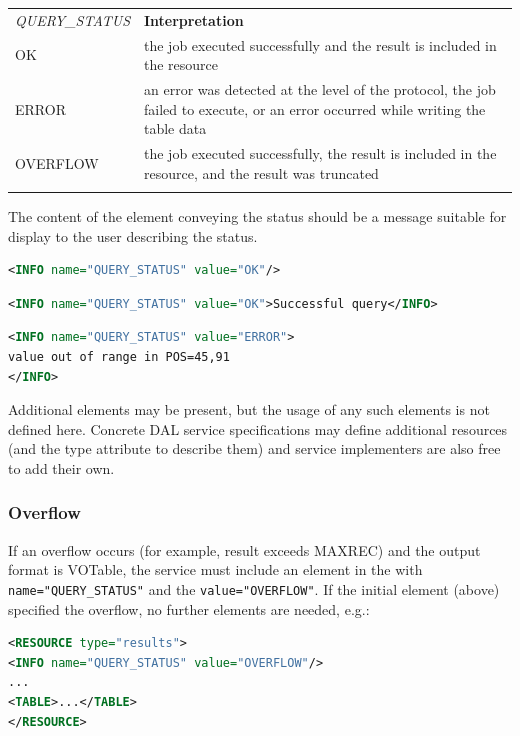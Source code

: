 \documentclass[11pt,letter]{ivoa}
\begin{document}
\begin{tabular}{l p{8cm}}
\sptablerule
\emph{QUERY\_STATUS}&\textbf{Interpretation}\\
\sptablerule
OK & the job executed successfully and the result is included in the resource \\
ERROR & an error was detected at the level of the protocol, the job failed to
execute, or an error occurred while writing the table data \\
OVERFLOW & the job executed successfully, the result is included in the
resource, and the result was truncated \\
\sptablerule
\label{tab:query-status}
\end{tabular}

The content of the  element conveying the status should be a message
suitable for display to the user describing the status.

\begin{lstlisting}[language=XML]
<INFO name="QUERY_STATUS" value="OK"/>
\end{lstlisting}

\begin{lstlisting}[language=XML]
<INFO name="QUERY_STATUS" value="OK">Successful query</INFO>
\end{lstlisting}

\begin{lstlisting}[language=XML]
<INFO name="QUERY_STATUS" value="ERROR">
value out of range in POS=45,91
</INFO>
\end{lstlisting}

Additional  elements may be present, but the usage of any such elements
is not defined here. Concrete DAL service specifications may define additional
resources (and the type attribute to describe them) and service implementers are
also free to add their own.

\subsubsection{Overflow}
\label{sec:response-overflow}
If an overflow occurs (for example, result exceeds MAXREC) and the output format
is VOTable, the service must include an  element in the 
with \verb|name="QUERY_STATUS"| and the \verb|value="OVERFLOW"|. If the initial
 element (above) specified the overflow, no further elements are needed,
e.g.:

\begin{lstlisting}[language=XML]
<RESOURCE type="results">
<INFO name="QUERY_STATUS" value="OVERFLOW"/>
...
<TABLE>...</TABLE>
</RESOURCE>
\end{lstlisting}
\end{document}
